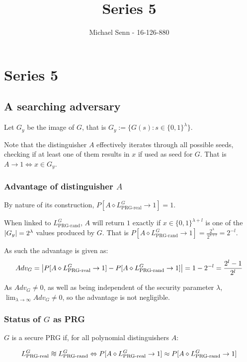\documentclass[a4paper]{scrreprt}
\title{Series 5}
\author{Michael Senn \maillink{michael.senn@students.unibe.ch} - 16-126-880}
\date{\printdate}
\DeclarePairedDelimiter\abs{\lvert}{\rvert}
\newcommand*{\diffeo}{%
  \mathrel{\vcenter{\offinterlineskip
  \hbox{$\sim$}\vskip-.35ex\hbox{$\sim$}\vskip-.35ex\hbox{$\sim$}}}}
\begin{document}
\maketitle


\setcounter{chapter}{4}
\chapter{Series 5}

\section{A searching adversary}

Let $G_y$ be the image of $G$, that is $G_y := \{G(s) : s \in \{0,
1\}^\lambda\}$.

Note that the distinguisher $A$ effectively iterates through all possible
seeds, checking if at least one of them results in $x$ if used as seed for $G$.
That is $A \rightarrow 1 \Leftrightarrow x \in G_y$.

\subsection{Advantage of distinguisher $A$}

By nature of its construction, $P[A \diamond L^G_{\text{PRG-real}} \rightarrow
1] = 1$.

When linked to $L^G_{\text{PRG-rand}}$, $A$ will return $1$ exactly if $x \in
\{0, 1\}^{\lambda + l}$ is one of the $\abs{G_y} = 2^\lambda$ values produced
by $G$. That is $P[A \diamond L^G_{\text{PRG-rand}} \rightarrow 1] =
\frac{2^\lambda}{2^{\lambda + l}} = 2^{-l}$.

As such the advantage is given as:
\[
	Adv_G = \abs*{P[A \diamond L^G_{\text{PRG-real}} \rightarrow 1] - P[A \diamond L^G_{\text{PRG-rand}} \rightarrow 1]} = 1 - 2^{-l} = \frac{2^l- 1}{2^l}
\]

As $Adv_G \neq 0$, as well as being independent of the security parameter
$\lambda$, $\lim_{\lambda \rightarrow \infty}{Adv_G} \neq 0$, so the advantage
is not negligible.

\subsection{Status of $G$ as PRG}

$G$ is a secure PRG if, for all polynomial distinguishers $A$:

\[
	L^G_{\text{PRG-real}} \diffeo L^G_{\text{PRG-rand}} \Leftrightarrow P[A
	\diamond L^G_{\text{PRG-real}} \rightarrow 1] \approx P[A \diamond
	L^G_{\text{PRG-rand}} \rightarrow 1]
\]
\end{document}
